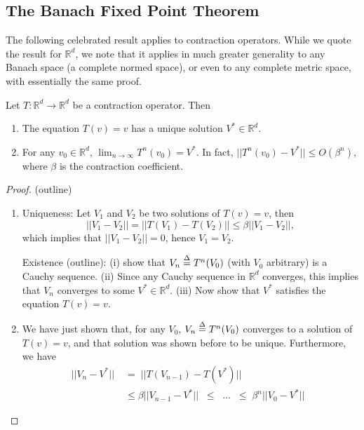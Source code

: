 \subsection{The Banach Fixed Point Theorem}
The following celebrated result applies to contraction operators. While we quote the result for $\mathbb R^d$, we note that it applies in much greater generality to any Banach space (a complete normed space), or even to any complete metric space, with essentially the same proof.

\begin{theorem}
Let $T:\mathbb R^d \to \mathbb R^d$  be a contraction operator. Then
\begin{enumerate}
  \item The equation $T(v) = v$ has a unique solution  $V^*\in \mathbb R^d$.
  \item For any $v_0 \in \mathbb R^d$,  ${\lim _{n \to \infty }}{T^n}({v_0}) = {V^*}$.
          In fact,  $||{T^n}({v_0}) - {V^*}|| \le O({\beta ^n})$, where $\beta $ is the contraction coefficient.
\end{enumerate}
\end{theorem}

\begin{proof}
(outline)
\begin{enumerate}
  \item Uniqueness: Let ${V_1}$ and ${V_2}$ be two solutions of $T(v) = v$, then
\[||{V_1} - {V_2}|| = ||T({V_1}) - T({V_2})|| \le \beta ||{V_1} - {V_2}||,\]
which implies that $||{V_1} - {V_2}|| = 0$, hence ${V_1} = {V_2}$.

Existence (outline):  (i) show that ${V_n} \buildrel \Delta \over = {T^n}({V_0})$ (with ${V_0}$ arbitrary) is a Cauchy sequence. (ii) Since any Cauchy sequence in $\mathbb R^d$ converges, this implies that ${V_n}$ converges to some $V^*\in \mathbb R^d$. (iii) Now show that ${V^*}$ satisfies the equation $T(v) = v$.
  \item We have just shown that, for any ${V_0}$, ${V_n} \buildrel \Delta \over = {T^n}({V_0})$ converges to a solution of $T(v) = v$, and that solution was shown before to be unique.  Furthermore, we have
\begin{align*}
||{V_n} - {V^*}||\; &= \;||T({V_{n - 1}}) - T({V^*})||\\
&\le \beta ||{V_{n - 1}} - {V^*}||\;\; \le \;\; \ldots \;\; \le \;{\beta ^n}||{V_0} - {V^*}||\;\;
\end{align*}
\end{enumerate}
\end{proof}


